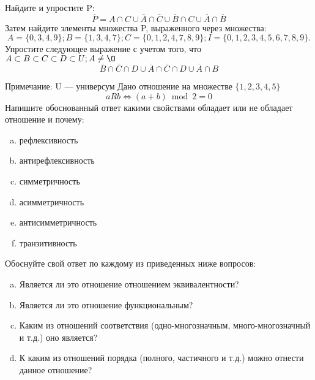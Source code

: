 \documentclass[10pt]{exam}
\begin{document}
\begin{questions}
\question
Найдите и упростите P:
\begin{equation*}
\overline{P} = A \cap C \cup \overline{A} \cap \overline{C} \cup \overline{B} \cap C \cup \overline{A} \cap \overline{B}
\end{equation*}
Затем найдите элементы множества P, выраженного через множества:
\begin{equation*}
A = \{0, 3, 4, 9\}; 
B = \{1, 3, 4, 7\};
C = \{0, 1, 2, 4, 7, 8, 9\};
I = \{0, 1, 2, 3, 4, 5, 6, 7, 8, 9\}.
\end{equation*}\question
Упростите следующее выражение с учетом того, что $A\subset B \subset C \subset D \subset U; A \neq \O$
\begin{equation*}
\overline{B} \cap \overline{C} \cap D \cup \overline{A} \cap \overline{C} \cap D \cup \overline{A} \cap B
\end{equation*}

Примечание: U — универсум\question
Дано отношение на множестве $\{1, 2, 3, 4, 5\}$ 
\begin{equation*}
aRb \iff (a+b) \bmod 2 =0
\end{equation*}
Напишите обоснованный ответ какими свойствами обладает или не обладает отношение и почему:   
\begin{enumerate} [a)]\setcounter{enumi}{0}
\item рефлексивность
\item антирефлексивность
\item симметричность
\item асимметричность
\item антисимметричность
\item транзитивность
\end{enumerate}

Обоснуйте свой ответ по каждому из приведенных ниже вопросов:
\begin{enumerate} [a)]\setcounter{enumi}{0}
    \item Является ли это отношение отношением эквивалентности?
    \item Является ли это отношение функциональным?
    \item Каким из отношений соответствия (одно-многозначным, много-многозначный и т.д.) оно является?
    \item К каким из отношений порядка (полного, частичного и т.д.) можно отнести данное отношение?
\end{enumerate}




\end{questions}
\end{document}
